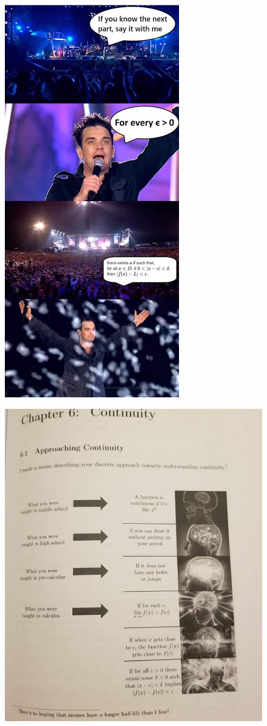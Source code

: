 \documentclass[handout, aspectratio=169]{beamer}
\begin{document}
\begin{frame}
	\begin{figure}[t]
		\begin{minipage}{0.48\textwidth}
			\centering
			\includegraphics[width=5 cm]{19.jpg}
			
		\end{minipage}
	\end{figure}
\end{frame}
\begin{frame} 
	\begin{figure}
		\begin{minipage}{0.48\textwidth}
			\centering
			\includegraphics[width=7 cm]{12.jpg}
			
		\end{minipage}
	\end{figure}
\end{frame}
\end{document}
